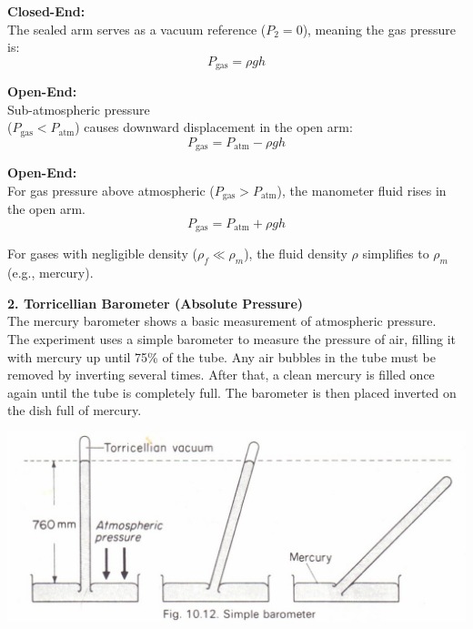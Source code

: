 \documentclass{article}
\begin{document}
\begin{center}
\begin{minipage}[t]{0.32\textwidth}
	\textbf{Closed-End:} \\
	The sealed arm serves as a vacuum reference ($P_2 = 0$), meaning the gas pressure is:
	\begin{equation}
		P_{\text{gas}} = \rho g h
	\end{equation}
\end{minipage}\hfill
\begin{minipage}[t]{0.32\textwidth}
	\textbf{Open-End:} \\
	Sub-atmospheric pressure\\ ($P_{\text{gas}}<P_{\text{atm}}$) causes downward displacement in the open arm:
	\begin{equation}
		P_{\text{gas}} = P_{\text{atm}} - \rho g h
	\end{equation}
\end{minipage}\hfill
\begin{minipage}[t]{0.32\textwidth}
	\textbf{Open-End:} \\
	For gas pressure above atmospheric ($P_{\text{gas}} > P_{\text{atm}}$), the manometer fluid rises in the open arm.	\begin{equation}
		P_{\text{gas}} = P_{\text{atm}} + \rho g h
	\end{equation}
\end{minipage}
\end{center}\vspace{0.3em}
For gases with negligible density ($\rho_f \ll \rho_m$), the fluid density $\rho$ simplifies to $\rho_m$ (e.g., mercury).\\[1em]
\begin{minipage}{0.5\textwidth}
	\small\textbf{2. Torricellian Barometer (Absolute Pressure)}\\[8pt]	
	\large The mercury barometer shows a basic measurement of atmospheric pressure.\\[8pt]
	The experiment uses a simple barometer to measure the pressure of air, filling it with mercury up until 75\% of the tube. Any air bubbles in the tube must be removed by inverting several times. After that, a clean mercury is filled once again until the tube is completely full. The barometer is then placed inverted on the dish full of mercury.  
\end{minipage}\hfill
\begin{minipage}{0.47\textwidth}\centering
	\includegraphics[width=1\textwidth]{images/1204.jpg}
	\label{fig:1204}
\end{minipage}\\[6pt]
\end{document}
